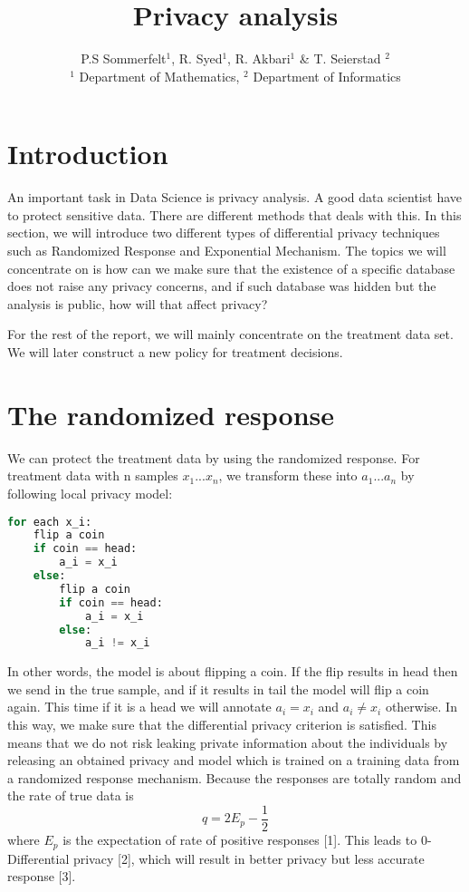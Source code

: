 \documentclass[a4paper, 12pt]{extarticle}
\title{Privacy analysis}
\author{P.S Sommerfelt$^1$, R. Syed$^1$, R. Akbari$^1$ & T. Seierstad $^2$ \\
  \small $^1$ Department of Mathematics, \small $^2$ Department of Informatics}
\begin{document}
\maketitle

\section*{Introduction}
An important task in Data Science is privacy analysis. A good data scientist have to protect sensitive data. There are different methods that deals with this. In this section, we will introduce two different types of differential privacy techniques such as Randomized Response and Exponential Mechanism. The topics we will concentrate on is how can we make sure that the existence of a specific database does not raise any privacy concerns, and if such database was hidden but the analysis is public, how will that affect privacy?

For the rest of the report, we will mainly concentrate on the treatment data set. We will later construct a new policy for treatment decisions.

\section*{The randomized response}
We can protect the treatment data by using the randomized response. For treatment data with n samples ${x_1 ... x_n}$, we transform these into ${a_1...a_n}$ by following local privacy model:
\begin{lstlisting}[language=Python]
for each x_i:
    flip a coin
    if coin == head:
        a_i = x_i
    else:
        flip a coin
        if coin == head:
            a_i = x_i 
        else:
            a_i != x_i 
\end{lstlisting}
In other words, the model is about flipping a coin. If the flip results in head then we send in the true sample, and if it results in tail the model will flip a coin again. This time if it is a head we will annotate $a_i = x_i$ and $a_i \neq x_i$ otherwise. In this way, we make sure that the differential privacy criterion is satisfied. This means that we do not risk leaking private information about the individuals by releasing an obtained privacy and model which is trained on a training data from a randomized response mechanism. Because the responses are totally random and the rate of true data is 
$$ q =  2 E_p - \frac{1}{2}$$
where $E_p$ is the expectation of rate of positive responses [1]. This leads to 0-Differential privacy [2], which will result in better privacy but less accurate response [3].
\end{document}
